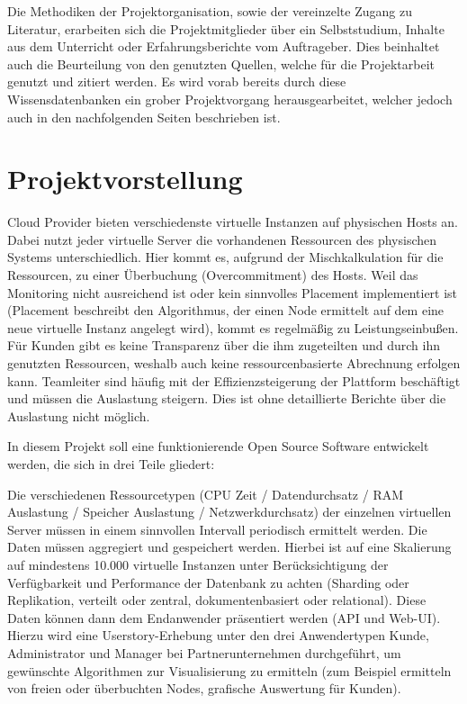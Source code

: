 Die Methodiken der Projektorganisation, sowie der vereinzelte Zugang zu
Literatur, erarbeiten sich die Projektmitglieder über ein Selbststudium, Inhalte
aus dem Unterricht oder Erfahrungsberichte vom Auftrageber. Dies
beinhaltet auch die Beurteilung von den genutzten Quellen, welche für die
Projektarbeit genutzt und zitiert werden. Es wird vorab bereits durch diese
Wissensdatenbanken ein grober Projektvorgang herausgearbeitet, welcher jedoch
auch in den nachfolgenden Seiten beschrieben ist.
\all%

\chapter{Projektvorstellung}
\label{subsec:projektvorstellung}
Cloud Provider bieten verschiedenste virtuelle Instanzen auf physischen Hosts
an. Dabei nutzt jeder virtuelle Server die vorhandenen Ressourcen des
physischen Systems unterschiedlich. Hier kommt es, aufgrund der
Mischkalkulation für die Ressourcen, zu einer Überbuchung (Overcommitment) des
Hosts. Weil das Monitoring nicht ausreichend ist oder kein sinnvolles Placement
implementiert ist (Placement beschreibt den Algorithmus, der einen Node
ermittelt auf dem eine neue virtuelle Instanz angelegt wird), kommt es
regelmäßig zu Leistungseinbußen. Für Kunden gibt es keine Transparenz über die
ihm zugeteilten und durch ihn genutzten Ressourcen, weshalb auch keine
ressourcenbasierte Abrechnung erfolgen kann. Teamleiter sind häufig mit der
Effizienzsteigerung der Plattform beschäftigt und müssen die Auslastung
steigern. Dies ist ohne detaillierte Berichte über die Auslastung nicht
möglich.

In diesem Projekt soll eine funktionierende Open Source Software entwickelt
werden, die sich in drei Teile gliedert:

\begin{outline}
  \1 Die verschiedenen Ressourcetypen (CPU Zeit / Datendurchsatz / RAM
  Auslastung / Speicher Auslastung / Netzwerkdurchsatz) der einzelnen
  virtuellen Server müssen in einem sinnvollen Intervall periodisch ermittelt
  werden.
  \1 Die Daten müssen aggregiert und gespeichert werden. Hierbei ist auf eine
  Skalierung auf mindestens 10.000 virtuelle Instanzen unter Berücksichtigung
  der Verfügbarkeit und Performance der Datenbank zu achten (Sharding oder
  Replikation, verteilt oder zentral, dokumentenbasiert oder relational).
  \1 Diese Daten können dann dem Endanwender präsentiert werden (\gls{API} und
  Web-UI). Hierzu wird eine Userstory-Erhebung unter den drei Anwendertypen
  Kunde, Administrator und Manager bei Partnerunternehmen durchgeführt, um
  gewünschte Algorithmen zur Visualisierung zu ermitteln (zum Beispiel
  ermitteln von freien oder überbuchten Nodes, grafische Auswertung für Kunden).
\end{outline}

